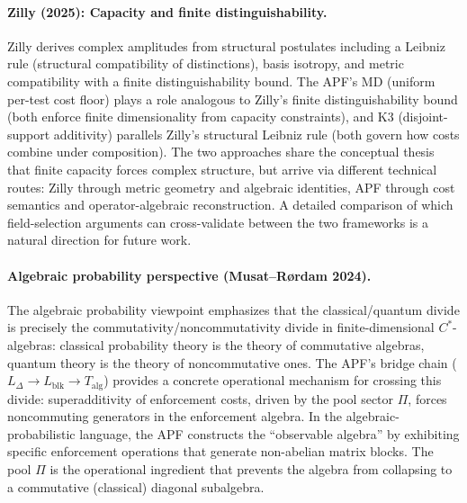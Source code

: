 \documentclass[11pt,a4paper]{article}
\theoremstyle{definition}
\begin{document}
\paragraph{Zilly (2025): Capacity and finite distinguishability.}
Zilly derives complex amplitudes from structural postulates including a Leibniz rule (structural compatibility of distinctions), basis isotropy, and metric compatibility with a finite distinguishability bound.  The APF's MD (uniform per-test cost floor) plays a role analogous to Zilly's finite distinguishability bound (both enforce finite dimensionality from capacity constraints), and K3 (disjoint-support additivity) parallels Zilly's structural Leibniz rule (both govern how costs combine under composition).  The two approaches share the conceptual thesis that finite capacity forces complex structure, but arrive via different technical routes: Zilly through metric geometry and algebraic identities, APF through cost semantics and operator-algebraic reconstruction.  A detailed comparison of which field-selection arguments can cross-validate between the two frameworks is a natural direction for future work.

\paragraph{Algebraic probability perspective (Musat--R\o rdam 2024).}
The algebraic probability viewpoint emphasizes that the classical/quantum divide is precisely the commutativity/noncommutativity divide in finite-dimensional $C^*$-algebras: classical probability theory is the theory of commutative algebras, quantum theory is the theory of noncommutative ones.  The APF's bridge chain ($L_\Delta \to L_{\mathrm{blk}} \to T_{\mathrm{alg}}$) provides a concrete operational mechanism for crossing this divide: superadditivity of enforcement costs, driven by the pool sector $\Pi$, forces noncommuting generators in the enforcement algebra.  In the algebraic-probabilistic language, the APF constructs the ``observable algebra'' by exhibiting specific enforcement operations that generate non-abelian matrix blocks.  The pool $\Pi$ is the operational ingredient that prevents the algebra from collapsing to a commutative (classical) diagonal subalgebra.
\end{document}
